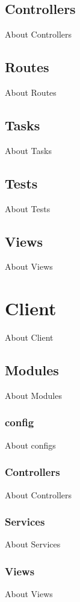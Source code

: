 \documentclass[a4paper,11pt]{report}
\begin{document}
\subsection{Controllers}
About Controllers

\subsection{Routes}
About Routes

\subsection{Tasks}
About Tasks

\subsection{Tests}
About Tests

\subsection{Views}
About Views

\section{Client}
About Client

\subsection{Modules}
About Modules

\subsubsection{config}
About configs

\subsubsection{Controllers}
About Controllers

\subsubsection{Services}
About Services

\subsubsection{Views}
About Views
\end{document}
